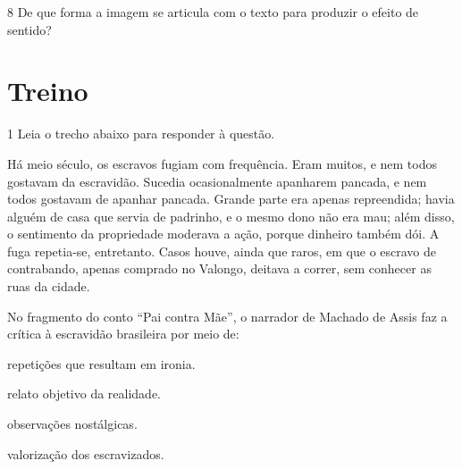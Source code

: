 \num{8} De que forma a imagem se articula com o texto para produzir
o efeito de sentido?


\section*{Treino}

\num{1} Leia o trecho abaixo para responder à questão. 

\begin{myquote}

Há meio século, os escravos fugiam com frequência. Eram muitos, e nem todos
gostavam da escravidão. Sucedia ocasionalmente apanharem pancada, e nem todos
gostavam de apanhar pancada. Grande parte era apenas repreendida; havia alguém de
casa que servia de padrinho, e o mesmo dono não era mau; além disso, o sentimento da
propriedade moderava a ação, porque dinheiro também dói. A fuga repetia-se,
entretanto. Casos houve, ainda que raros, em que o escravo de contrabando, apenas
comprado no Valongo, deitava a correr, sem conhecer as ruas da cidade.


\end{myquote}

No fragmento do conto ``Pai contra Mãe'', o narrador de Machado de Assis faz a crítica
à escravidão brasileira por meio de:

\begin{escolha}

  \item repetições que resultam em ironia.
  
  \item relato objetivo da realidade.
  
  \item observações nostálgicas. 
  
  \item valorização dos escravizados. 

\end{escolha}

